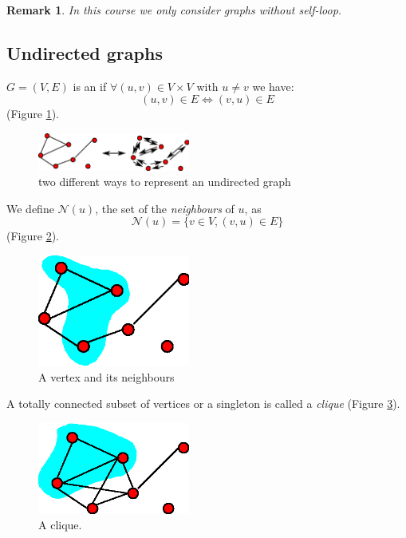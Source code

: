 \documentclass[12pt]{report}
\newtheorem{remarque}{Remark}[section]
\begin{document}
\begin{remarque} In this course we only consider graphs without self-loop.
\end{remarque}

\subsection{Undirected graphs}

\begin{definition}
  $G=(V,E)$ is an \emph{} if $\forall (u,v)\in
  V\times V$ with $u \neq v$ we have: $$(u,v)\in E \Longleftrightarrow (v,u)
  \in E$$ (Figure \ref{graph01}).
\end{definition}

\begin{figure}[ht]
  \centering
  \includegraphics[width=5cm]{./figures/graph01.eps}
  \caption{two different ways to represent an undirected graph}
 \label{graph01}
 \end{figure}
\FloatBarrier

\begin{definition}[neighbour] We 
  define $\mathcal{N}(u)$, the set of the \emph{neighbours} of $u$, as  $$\mathcal{N}(u)=\{ v\in V, (v,u)\in E \}$$ (Figure \ref{graph02}).
\end{definition}

\begin{figure}[ht]
  \centering
  \includegraphics[width=5cm]{./figures/graph02.eps}
  \caption{A vertex and its neighbours}
  \label{graph02}
\end{figure}

\FloatBarrier

\begin{definition}[clique]
  A totally connected subset of vertices  or a singleton is called a \emph{clique} (Figure \ref{graph03}).
\end{definition}

\begin{figure}[ht]
    \centering
  \includegraphics[width=5cm]{./figures/graph03.eps}
  \caption{A clique.}
\label{graph03}
\end{figure}
\FloatBarrier
\end{document}
